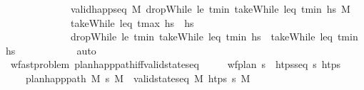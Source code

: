 \begin{isabellebody}
\ \ \ \ \ \ \ \ \ \ \ \ \ \ {\isacartoucheopen}valid{\isacharunderscore}{\kern0pt}happ{\isacharunderscore}{\kern0pt}seq\ M\ {\isacharparenleft}{\kern0pt}dropWhile\ {\isacharparenleft}{\kern0pt}le\ t\isactrlsub m\isactrlsub i\isactrlsub n{\isacharparenright}{\kern0pt}\ {\isacharparenleft}{\kern0pt}takeWhile\ {\isacharparenleft}{\kern0pt}leq\ t\isactrlsub m\isactrlsub i\isactrlsub n{\isacharparenright}{\kern0pt}\ hs{\isacharparenright}{\kern0pt}{\isacharparenright}{\kern0pt}\ M\isanewline
\ \ \ \ \ \ \ \ \ \ \ \ \ \ {\isacartoucheopen}takeWhile\ {\isacharparenleft}{\kern0pt}leq\ t\isactrlsub m\isactrlsub a\isactrlsub x{\isacharparenright}{\kern0pt}\ hs\ {\isacharequal}{\kern0pt}\ hs{\isacartoucheclose}\isanewline
\ \ \ \ \ \ \ \ \ \ \ \ \ \ {\isacartoucheopen}dropWhile\ {\isacharparenleft}{\kern0pt}le\ t\isactrlsub m\isactrlsub i\isactrlsub n{\isacharparenright}{\kern0pt}\ {\isacharparenleft}{\kern0pt}takeWhile\ {\isacharparenleft}{\kern0pt}leq\ t\isactrlsub m\isactrlsub i\isactrlsub n{\isacharparenright}{\kern0pt}\ hs{\isacharparenright}{\kern0pt}\ {\isacharequal}{\kern0pt}\ takeWhile\ {\isacharparenleft}{\kern0pt}leq\ t\isactrlsub m\isactrlsub i\isactrlsub n{\isacharparenright}{\kern0pt}\ hs{\isacartoucheclose}\isanewline
\ \ \ \ \ \ \ \ \ \ \isamarkupfalse%
\ auto\isanewline
\ \ \ \ \ \ \isamarkupfalse%
\isanewline
\ \ \ \ \isamarkupfalse%
\isanewline
\ \ \isamarkupfalse%
%
\endisatagproof
{\isafoldproof}%
%
\isadelimproof
\isanewline
%
\endisadelimproof
\isanewline
\ \ \isamarkupfalse%
\ {\isacharparenleft}{\kern0pt}\ wf{\isacharunderscore}{\kern0pt}ast{\isacharunderscore}{\kern0pt}problem{\isacharparenright}{\kern0pt}\ plan{\isacharunderscore}{\kern0pt}happ{\isacharunderscore}{\kern0pt}path{\isacharunderscore}{\kern0pt}iff{\isacharunderscore}{\kern0pt}valid{\isacharunderscore}{\kern0pt}state{\isacharunderscore}{\kern0pt}seq{\isacharcolon}{\kern0pt}\isanewline
\ \ \ \ \ {\isachardoublequoteopen}wf{\isacharunderscore}{\kern0pt}plan\ {\isasympi}s{\isachardoublequoteclose}\ \ {\isachardoublequoteopen}htps{\isacharunderscore}{\kern0pt}seq\ {\isasympi}s\ htps{\isachardoublequoteclose}\isanewline
\ \ \ \ \ {\isachardoublequoteopen}plan{\isacharunderscore}{\kern0pt}happ{\isacharunderscore}{\kern0pt}path\ M\ {\isasympi}s\ M{\isacharprime}{\kern0pt}\ {\isasymlongleftrightarrow}\ valid{\isacharunderscore}{\kern0pt}state{\isacharunderscore}{\kern0pt}seq\ M\ htps\ {\isasympi}s\ M{\isacharprime}{\kern0pt}{\isachardoublequoteclose}\isanewline

\end{isabellebody}

